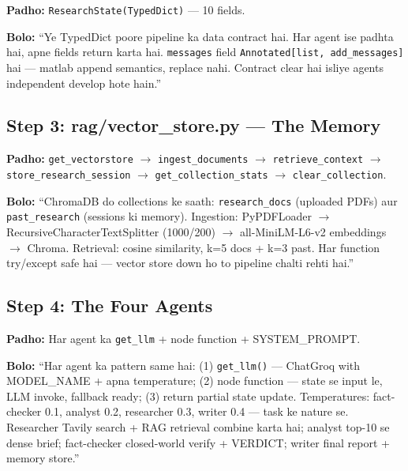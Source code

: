 \begin{codestorybox}
\textbf{Padho:} \texttt{ResearchState(TypedDict)} --- 10 fields.

\textbf{Bolo:} ``Ye TypedDict poore pipeline ka data contract hai. Har agent ise padhta hai, apne fields return karta hai. \texttt{messages} field \texttt{Annotated[list, add\_messages]} hai --- matlab append semantics, replace nahi. Contract clear hai isliye agents independent develop hote hain.''
\end{codestorybox}

\subsection{Step 3: rag/vector\_store.py --- The Memory}

\begin{codestorybox}
\textbf{Padho:} \texttt{get\_vectorstore} $\rightarrow$ \texttt{ingest\_documents} $\rightarrow$ \texttt{retrieve\_context} $\rightarrow$ \texttt{store\_research\_session} $\rightarrow$ \texttt{get\_collection\_stats} $\rightarrow$ \texttt{clear\_collection}.

\textbf{Bolo:} ``ChromaDB do collections ke saath: \texttt{research\_docs} (uploaded PDFs) aur \texttt{past\_research} (sessions ki memory). Ingestion: PyPDFLoader $\rightarrow$ RecursiveCharacterTextSplitter (1000/200) $\rightarrow$ all-MiniLM-L6-v2 embeddings $\rightarrow$ Chroma. Retrieval: cosine similarity, k=5 docs + k=3 past. Har function try/except safe hai --- vector store down ho to pipeline chalti rehti hai.''
\end{codestorybox}

\subsection{Step 4: The Four Agents}

\begin{codestorybox}
\textbf{Padho:} Har agent ka \texttt{get\_llm} + node function + SYSTEM\_PROMPT.

\textbf{Bolo:} ``Har agent ka pattern same hai: (1) \texttt{get\_llm()} --- ChatGroq with MODEL\_NAME + apna temperature; (2) node function --- state se input le, LLM invoke, fallback ready; (3) return partial state update. Temperatures: fact-checker 0.1, analyst 0.2, researcher 0.3, writer 0.4 --- task ke nature se. Researcher Tavily search + RAG retrieval combine karta hai; analyst top-10 se dense brief; fact-checker closed-world verify + VERDICT; writer final report + memory store.''
\end{codestorybox}

